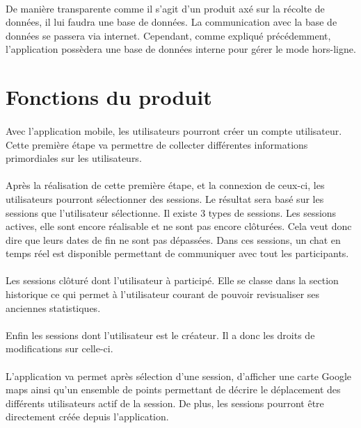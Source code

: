 \documentclass[titlepage, 12pt]{report}
\begin{document}
\paragraph{}De manière transparente comme il s'agit d'un produit axé sur la récolte de données, il lui faudra une base de données. La communication avec la base de données se passera via internet. Cependant, comme expliqué précédemment, l'application possèdera une base de données interne pour gérer le mode hors-ligne. 

\section{Fonctions du produit}

\paragraph{}Avec l'application mobile, les utilisateurs pourront créer un compte utilisateur. Cette première étape va permettre de collecter différentes informations primordiales sur les utilisateurs. 

\paragraph{}Après la réalisation de cette première étape, et la connexion de ceux-ci, les utilisateurs pourront sélectionner des sessions. Le résultat sera basé sur les sessions que l'utilisateur sélectionne. Il existe 3 types de sessions. Les sessions actives, elle sont encore réalisable et ne sont pas encore clôturées. Cela veut donc dire que leurs dates de fin ne sont pas dépassées. Dans ces sessions, un chat en temps réel est disponible permettant de communiquer avec tout les participants.
\paragraph{}Les sessions clôturé dont l'utilisateur à participé. Elle se classe dans la section historique ce qui permet à l'utilisateur courant de pouvoir revisualiser ses anciennes statistiques.
\paragraph{}Enfin les sessions dont l'utilisateur est le créateur. Il a donc les droits de modifications sur celle-ci.

\paragraph{}L'application va permet après sélection d'une session, d'afficher une carte Google maps ainsi qu'un ensemble de points permettant de décrire le déplacement des différents utilisateurs actif de la session.
De plus, les sessions pourront être directement créée depuis l'application.
\end{document}
